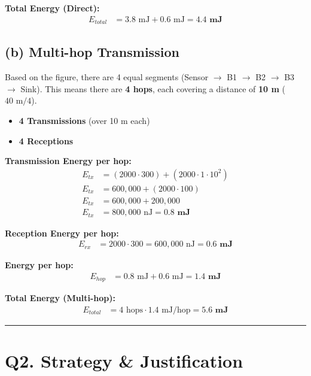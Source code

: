 \documentclass[11pt]{article}
\begin{document}
\textbf{Total Energy (Direct):}
\begin{align*}
    E_{total} &= 3.8 \text{ mJ} + 0.6 \text{ mJ} = \mathbf{4.4 \text{ mJ}}
\end{align*}

\subsection*{(b) Multi-hop Transmission}
Based on the figure, there are 4 equal segments (Sensor $\rightarrow$ B1 $\rightarrow$ B2 $\rightarrow$ B3 $\rightarrow$ Sink). This means there are \textbf{4 hops}, each covering a distance of \textbf{10 m} ($40 \text{ m} / 4$).
\begin{itemize}
    \item \textbf{4 Transmissions} (over 10 m each)
    \item \textbf{4 Receptions}
\end{itemize}

\textbf{Transmission Energy per hop:}
\begin{align*}
    E_{tx} &= (2000 \cdot 300) + (2000 \cdot 1 \cdot 10^2) \\
    E_{tx} &= 600,000 + (2000 \cdot 100) \\
    E_{tx} &= 600,000 + 200,000 \\
    E_{tx} &= 800,000 \text{ nJ} = \mathbf{0.8 \text{ mJ}}
\end{align*}

\textbf{Reception Energy per hop:}
\begin{align*}
    E_{rx} &= 2000 \cdot 300 = 600,000 \text{ nJ} = \mathbf{0.6 \text{ mJ}}
\end{align*}

\textbf{Energy per hop:}
\begin{align*}
    E_{hop} &= 0.8 \text{ mJ} + 0.6 \text{ mJ} = \mathbf{1.4 \text{ mJ}}
\end{align*}

\textbf{Total Energy (Multi-hop):}
\begin{align*}
    E_{total} &= 4 \text{ hops} \cdot 1.4 \text{ mJ/hop} = \mathbf{5.6 \text{ mJ}}
\end{align*}

\vspace{0.5cm}
\hrule
\vspace{0.5cm}

\section*{Q2. Strategy \& Justification}
\end{document}
